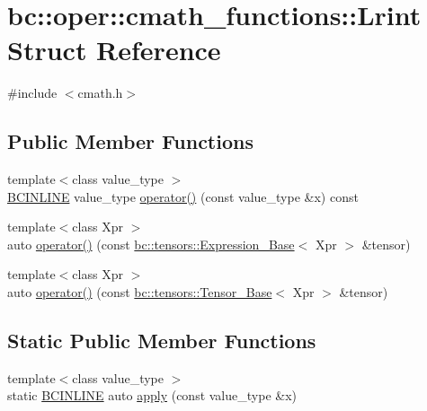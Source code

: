 \hypertarget{structbc_1_1oper_1_1cmath__functions_1_1Lrint}{}\section{bc\+:\+:oper\+:\+:cmath\+\_\+functions\+:\+:Lrint Struct Reference}
\label{structbc_1_1oper_1_1cmath__functions_1_1Lrint}


{\ttfamily \#include $<$cmath.\+h$>$}

\subsection*{Public Member Functions}
\begin{DoxyCompactItemize}
\item 
{\footnotesize template$<$class value\+\_\+type $>$ }\\\hyperlink{common_8h_a6699e8b0449da5c0fafb878e59c1d4b1}{B\+C\+I\+N\+L\+I\+NE} value\+\_\+type \hyperlink{structbc_1_1oper_1_1cmath__functions_1_1Lrint_a6e07d364a44ba2cb660cd8192d1ebe7e}{operator()} (const value\+\_\+type \&x) const
\item 
{\footnotesize template$<$class Xpr $>$ }\\auto \hyperlink{structbc_1_1oper_1_1cmath__functions_1_1Lrint_a812409c293c9b7c2237010a1d3e15154}{operator()} (const \hyperlink{classbc_1_1tensors_1_1Expression__Base}{bc\+::tensors\+::\+Expression\+\_\+\+Base}$<$ Xpr $>$ \&tensor)
\item 
{\footnotesize template$<$class Xpr $>$ }\\auto \hyperlink{structbc_1_1oper_1_1cmath__functions_1_1Lrint_aa4179a65cb6b7b8d926ec8e723de3b61}{operator()} (const \hyperlink{classbc_1_1tensors_1_1Tensor__Base}{bc\+::tensors\+::\+Tensor\+\_\+\+Base}$<$ Xpr $>$ \&tensor)
\end{DoxyCompactItemize}
\subsection*{Static Public Member Functions}
\begin{DoxyCompactItemize}
\item 
{\footnotesize template$<$class value\+\_\+type $>$ }\\static \hyperlink{common_8h_a6699e8b0449da5c0fafb878e59c1d4b1}{B\+C\+I\+N\+L\+I\+NE} auto \hyperlink{structbc_1_1oper_1_1cmath__functions_1_1Lrint_acf7db4c07e221dd4a5d4de0b20b0d024}{apply} (const value\+\_\+type \&x)
\end{DoxyCompactItemize}


